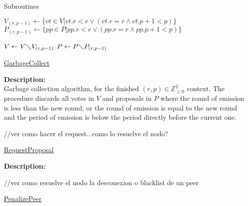 \documentclass[10pt,a4paper]{article}
\begin{document}
\begin{section}{Subroutines}

\begin{algorithm}[H]\label{algo:garbage-collect}
    \begin{algorithmic}[1]

    \State $V_{(r,p-1)} \gets \{ vt \in V | vt.r < r \lor (vt.r=r \land vt.p + 1 < p) \}$
    \State $P_{(r,p-1)} \gets \{ pp \in P | pp.r < r \lor (pp.r=r \land pp.p + 1 < p) \}$

    \State $V \gets V\diagdown V_{(r,p-1)}$
    \State $P \gets P\diagdown P_{(r,p-1)}$

    \EndFunction
    \end{algorithmic}
    \caption{\underline{GarbageCollect}}
\end{algorithm}

\noindent \textbf{Description:}\\
Garbage collection algorithm, for the finished $(r,p)\in\mathbb{Z}_{\ge 0}^2$ context.
The procedure discards all votes in $V$ and proposals in $P$ where the round of emission is less than the
new round, or the round of emission is equal to the new round and the period of emission is below the period
directly before the current one.


\begin{algorithm}[H]\label{algo:request-proposal}
    \begin{algorithmic}[1]
        //ver como hacer el request...como lo resuelve el nodo?
    \EndFunction
    \end{algorithmic}
    \caption{\underline{RequestProposal}}
\end{algorithm}

\noindent \textbf{Description:}\\


\begin{algorithm}[H]\label{algo:penalize-peer}
    \begin{algorithmic}[1]
        //ver como resuelve el nodo la desconexion o blacklist de un peer
    \EndFunction
    \end{algorithmic}
    \caption{\underline{PenalizePeer}}
\end{algorithm}


\end{section}
\end{document}
